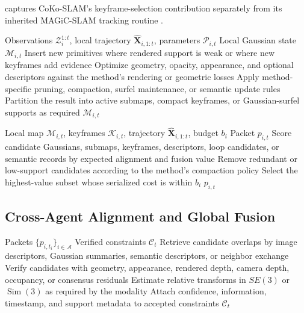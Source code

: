 \documentclass[11pt, a4paper, logo]{googledeepmind}
\begin{document}
 captures CoKo-SLAM's keyframe-selection contribution separately from its inherited MAGiC-SLAM tracking routine \citep{li2026coko_slam}.

\begin{algorithm}[H]
\caption{Local Gaussian mapping}
\label{alg:app-local-mapping}
\small
\begin{algorithmic}[1]
  \Require Observations $\mathcal{Z}_i^{1:t}$, local trajectory $\hat{\mathbf{X}}_{i,1:t}$, parameters $\mathcal{P}_{i,t}$
  \Ensure Local Gaussian state $\mathcal{M}_{i,t}$
  \State Insert new primitives where rendered support is weak or where new keyframes add evidence
  \State Optimize geometry, opacity, appearance, and optional descriptors against the method's rendering or geometric losses
  \State Apply method-specific pruning, compaction, surfel maintenance, or semantic update rules
  \State Partition the result into active submaps, compact keyframes, or Gaussian-surfel supports as required
  \State \Return $\mathcal{M}_{i,t}$
\end{algorithmic}
\end{algorithm}

\begin{algorithm}[H]
\caption{Update selection under a communication budget}
\label{alg:app-update-selection}
\small
\begin{algorithmic}[1]
  \Require Local map $\mathcal{M}_{i,t}$, keyframes $\mathcal{K}_{i,t}$, trajectory $\hat{\mathbf{X}}_{i,1:t}$, budget $b_i$
  \Ensure Packet $p_{i,t}$
  \State Score candidate Gaussians, submaps, keyframes, descriptors, loop candidates, or semantic records by expected alignment and fusion value
  \State Remove redundant or low-support candidates according to the method's compaction policy
  \State Select the highest-value subset whose serialized cost is within $b_i$
  \State \Return $p_{i,t}$
\end{algorithmic}
\end{algorithm}

\subsection{Cross-Agent Alignment and Global Fusion}

\begin{algorithm}[H]
\caption{Cross-agent alignment}
\label{alg:app-cross-agent-alignment}
\small
\begin{algorithmic}[1]
  \Require Packets $\{p_{i,t_i}\}_{i\in\mathcal{A}}$
  \Ensure Verified constraints $\mathcal{C}_t$
  \State Retrieve candidate overlaps by image descriptors, Gaussian summaries, semantic descriptors, or neighbor exchange
  \State Verify candidates with geometry, appearance, rendered depth, camera depth, occupancy, or consensus residuals
  \State Estimate relative transforms in $SE(3)$ or $\operatorname{Sim}(3)$ as required by the modality
  \State Attach confidence, information, timestamp, and support metadata to accepted constraints
  \State \Return $\mathcal{C}_t$
\end{algorithmic}
\end{algorithm}
\end{document}
